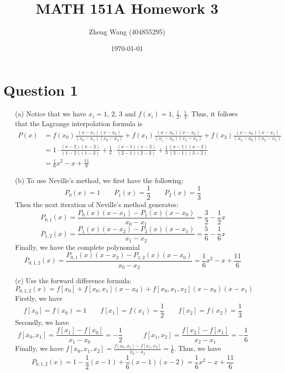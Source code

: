 \documentclass[11pt]{article}
\author{Zheng Wang (404855295)}
\date{\today}
\title{MATH 151A Homework 3}
\begin{document}
\maketitle

\section*{Question 1}
\begin{itemize}
	
	\item [(a)]
	Notice that we have $ x_i = 1 $, $ 2 $, $ 3 $ and $ f(x_i) = 1 $, $ \frac{1}{2} $, $ \frac{1}{3} $. Thus, it follows that the Lagrange interpolation formula is
	\begin{equation*}
	\begin{aligned}
	P(x) &= f(x_0)\frac{(x-x_1)(x-x_2)}{(x_0-x_1)(x_0-x_2)} + f(x_1)\frac{(x-x_0)(x-x_2)}{(x_1-x_0)(x_1-x_2)} + f(x_2)\frac{(x-x_0)(x-x_1)}{(x_2-x_0)(x_2-x_1)}\\
	&= 1 \cdot \frac{(x-2)(x-3)}{(1-2)(1-3)} + \frac{1}{2}\cdot\frac{(x-1)(x-3)}{(2-1)(2-3)} + \frac{1}{3}\frac{(x-1)(x-2)}{(3-1)(3-2)}\\
	& = \frac{1}{6}x^2-x+\frac{11}{6}
	\end{aligned}
	\end{equation*}
	\item [(b)]
	To use Neville's method, we first have the following:
	\[ P_0(x) = 1 \quad\quad P_1(x) = \frac{1}{2} \quad\quad P_2(x) = \frac{1}{3} \]
	Then the next iteration of Neville's method generates:
	\[ P_{0,1}(x) = \frac{P_0(x)(x-x_1) - P_1(x)(x-x_0)}{x_0 - x_1} = \frac{3}{2} - \frac{1}{2}x\]
	\[ P_{1,2}(x) = \frac{P_1(x)(x-x_2) - P_2(x)(x-x_1)}{x_1 - x_2} = \frac{5}{6} - \frac{1}{6}x \]
	Finally, we have the complete polynomial
	\[ P_{0,1,2}(x) = \frac{P_{0,1}(x)(x-x_2)-  P_{1,2}(x)(x-x_0)}{x_0-x_2} = \frac{1}{6}x^2-x+\frac{11}{6} \]
	\item[(c)]
	Use the forward difference formula:
	\[ P_{0,1,2}(x) = f[x_0] + f[x_0,x_1](x-x_0) + f[x_0,x_1,x_2](x-x_0)(x-x_1) \]
	Firstly, we have\[ f[x_0] = f(x_0) = 1 \quad\quad f[x_1] = f(x_1) = \frac{1}{2} \quad\quad f[x_2] = f(x_2) = \frac{1}{3} \]
	Secondly, we have \[ f[x_0, x_1] = \frac{f[x_1] - f[x_0]}{x_1 - x_0} = -\frac{1}{2} \quad\quad\quad f[x_1,x_2] = \frac{f[x_2] - f[x_1]}{x_2 - x_1} = -\frac{1}{6}\]
	Finally, we have $ f[x_0,x_1,x_2] = \frac{f[x_0,x_1] - f[x_1,x_2]}{x_0 - x_2} = \frac{1}{6}$. Thus, we have 
	\[ P_{0,1,2}(x) = 1  - \frac{1}{2}(x-1) + \frac{1}{6}(x-1)(x-2) =  \frac{1}{6}x^2-x+\frac{11}{6}  \]
\end{itemize}
\end{document}
